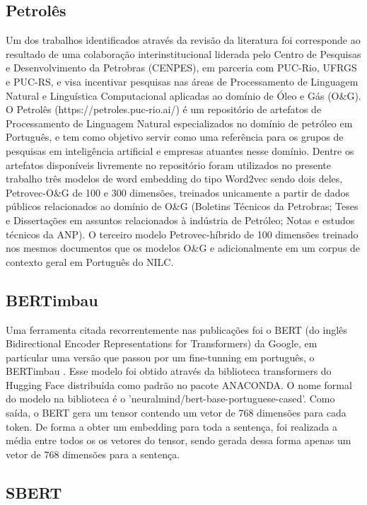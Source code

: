 \documentclass[conference]{IEEEtran}
\begin{document}
\subsection{Petrolês}
  
  Um dos trabalhos identificados através da revisão da literatura foi \cite{Gomes2021} corresponde ao resultado de uma colaboração interinstitucional liderada pelo Centro de Pesquisas e Desenvolvimento da Petrobras (CENPES), em parceria com PUC-Rio, UFRGS e PUC-RS, e visa incentivar pesquisas nas áreas de Processamento de Linguagem Natural e Linguística Computacional aplicadas ao domínio de Óleo e Gás (O\&G).
  O Petrolês (https://petroles.puc-rio.ai/) é um repositório de artefatos de Processamento de Linguagem Natural especializados no domínio de petróleo em Português, e tem como objetivo servir como uma referência para os grupos de pesquisas em inteligência artificial e empresas atuantes nesse domínio. Dentre os artefatos disponíveis livremente no repositório foram utilizados no presente trabalho três modelos de word embedding do tipo Word2vec sendo dois deles, Petrovec-O\&G de 100 e 300 dimensões, treinados unicamente a partir de dados públicos relacionados ao domínio de O\&G (Boletins Técnicos da Petrobras; Teses e Dissertações em assuntos relacionados à indústria de Petróleo; Notas e estudos técnicos da ANP). O terceiro modelo Petrovec-híbrido de 100 dimensões treinado nos mesmos documentos que os modelos O\&G e adicionalmente em um corpus de contexto geral em Português do NILC.

\subsection{BERTimbau}

  Uma ferramenta citada recorrentemente nas publicações foi o BERT (do inglês Bidirectional Encoder Representations for Transformers) da Google, em particular uma versão que passou por um fine-tunning em português, o BERTimbau \cite{souza2020bertimbau}. Esse modelo foi obtido através da biblioteca transformers do Hugging Face distribuída como padrão no pacote ANACONDA. O nome formal do modelo na biblioteca é o 'neuralmind/bert-base-portuguese-cased'. Como saída, o BERT gera um tensor contendo um vetor de 768 dimensões para cada token. De forma a obter um embedding para toda a sentença, foi realizada a média entre todos os os vetores do tensor, sendo gerada dessa forma apenas um vetor de 768 dimensões para a sentença. 

\subsection{SBERT}
\end{document}

